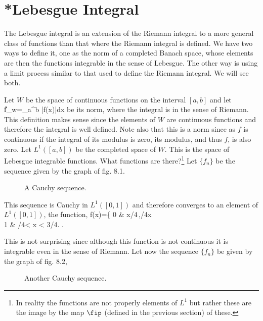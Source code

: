 \section{*Lebesgue Integral}

The Lebesgue integral is an extension of the Riemann integral to a more general class of functions than that where the Riemann integral is defined. We have two ways to define it, one as the norm of a completed Banach space, whose elements are then the functions integrable in the sense of Lebesgue. The other way is using a limit process similar to that used to define the Riemann integral. We will see both.

Let $W$ be the space of continuous functions on the interval $[a,b]$ and let
\beq
\|f\|_w=\int_a^b |f(x)|\;dx
\eeq
be its norm, where the integral is in the sense of Riemann. This definition makes sense since the elements of $W$ are continuous functions and therefore the integral is well defined. Note also that this is a norm since as $f$ is continuous if the integral of its modulus is zero, its modulus, and thus $f$, is also zero. Let $L^1([a,b])$ be the completed space of $W$. This is the space of Lebesgue integrable functions. What functions are there?\footnote{In reality the functions are not properly elements of $L^1$ but rather these are the image by the map $\fip$ (defined in the previous section) of these.}
Let $\{f_n\}$ be the sequence given by the graph of fig. 8.1.

\espa
\begin{figure}[htbp]
\begin{center}
\caption{A Cauchy sequence.}
\label{fig:8_1}
\end{center}
\end{figure}

This sequence is Cauchy in $L^1([0,1])$ and therefore converges to an element of $L^1([0,1])$, the function,
\beq
f(x)=\left\{
0 & \;\;\;\;\leq x/4\,,/4\leq x \\
1 & \;\;\;\;/4< x < 3/4.
\earr\right.
\eeq

This is not surprising since although this function is not continuous it is integrable even in the sense of Riemann.
Let now the sequence $\{f_n\}$ be given by the graph of fig. 8.2,

\espa
\begin{figure}[htbp]
\begin{center}
\caption{Another Cauchy sequence.}
\label{fig:8_2}
\end{center}
\end{figure}

